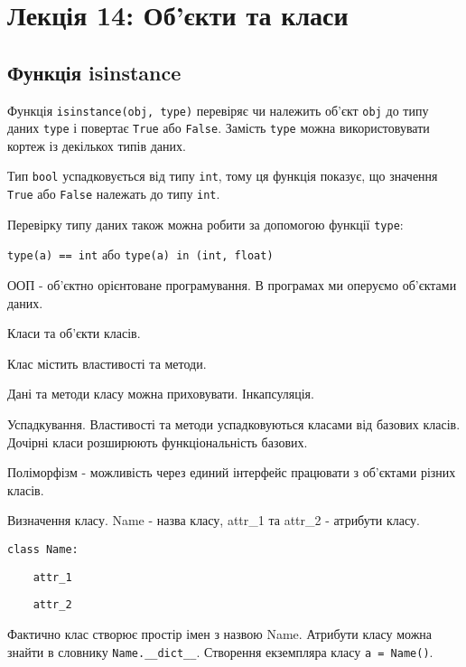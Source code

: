 \section{Лекція 14: Об’єкти та класи}
\subsection{Функція isinstance} 
\begin{frame}
Функція \texttt{isinstance(obj, type)} перевіряє чи належить об'єкт \texttt{obj} до типу даних \texttt{type} і повертає \texttt{True} або \texttt{False}. Замість \texttt{type} можна використовувати кортеж із декількох типів даних.

Тип \texttt{bool} успадковується від типу \texttt{int}, тому ця функція показує, що значення \texttt{True} або \texttt{False} належать до типу \texttt{int}.

Перевірку типу даних також можна робити за допомогою функції \texttt{type}:

\texttt{type(a) == int} або \texttt{type(a) in (int, float)}  


\end{frame}

\begin{frame}
ООП - об'єктно орієнтоване програмування. В програмах ми оперуємо об'єктами даних.

Класи та об'єкти класів.

Клас містить властивості та методи.

Дані та методи класу можна приховувати. Інкапсуляція.

Успадкування. Властивості та методи успадковуються класами від базових класів. Дочірні класи розширюють функціональність базових.

Поліморфізм - можливість через единий інтерфейс працювати з об'єктами різних класів.
\end{frame}

\begin{frame}
Визначення класу.
Name - назва класу, attr\_1 та attr\_2 - атрибути класу. 

\texttt{class Name:}

\texttt{~~~~attr\_1}

\texttt{~~~~attr\_2}

 Фактично клас створює простір імен з назвою Name. Атрибути класу можна знайти в словнику \texttt{Name.\_\_dict\_\_}. Створення екземпляра класу \texttt{a = Name()}.
\end{frame}
